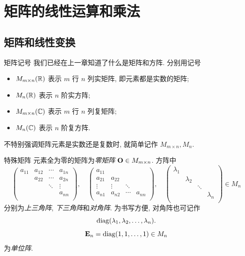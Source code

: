 \section{矩阵的线性运算和乘法}

\subsection{矩阵和线性变换}

\begin{frame}{矩阵记号}
	\onslide<+->
	我们已经在上一章知道了什么是矩阵和方阵.
	\onslide<+->
	分别用记号
	\begin{itemize}
		\item $M_{m\times n}({\mathbb{R}})$ 表示 $m$ 行 $n$ 列实矩阵, 即元素都是实数的矩阵;
		\item $M_n({\mathbb{R}})$ 表示 $n$ 阶实方阵;
		\item $M_{m\times n}({\mathbb{C}})$ 表示 $m$ 行 $n$ 列复矩阵;
		\item $M_n({\mathbb{C}})$ 表示 $n$ 阶复方阵.
	\end{itemize}
	\onslide<+->
	不特别强调矩阵元素是实数还是复数时, 就简单记作 $M_{m\times n},M_n$.
\end{frame}


\begin{frame}{特殊矩阵}
	\onslide<+->
	元素全为零的矩阵为\emph{零矩阵} ${\mathbf{O}}\in M_{m\times n}$.
	\onslide<+->
	方阵中
	\[\begin{pmatrix}
		a_{11}&a_{12}&\cdots&a_{1n}\\
		&a_{22}&\cdots&a_{2n}\\
		&&\ddots&\vdots\\
		&&&a_{nn}\\
	\end{pmatrix},\quad\begin{pmatrix}
		a_{11}&&&\\
		a_{21}&a_{22}&&\\
		\vdots&\vdots&\ddots&\\
		a_{n1}&a_{n2}&\cdots&a_{nn}\\
	\end{pmatrix},\quad\begin{pmatrix}
		\lambda_1&&&\\
		&\lambda_2&&\\
		&&\ddots&\\
		&&&\lambda_n\\
	\end{pmatrix}\in M_n\]
	分别为\emph{上三角阵}, \emph{下三角阵}和\emph{对角阵}.
	\onslide<+->
	为书写方便, 对角阵也可记作
	\[{\mathrm{diag}}(\lambda_1,\lambda_2,\dots,\lambda_n).\]
	\onslide<+->
	\[{\mathbf{E}}_n={\mathrm{diag}}(1,1,\dots,1)\in M_n\]
	为\emph{单位阵}.
\end{frame}



